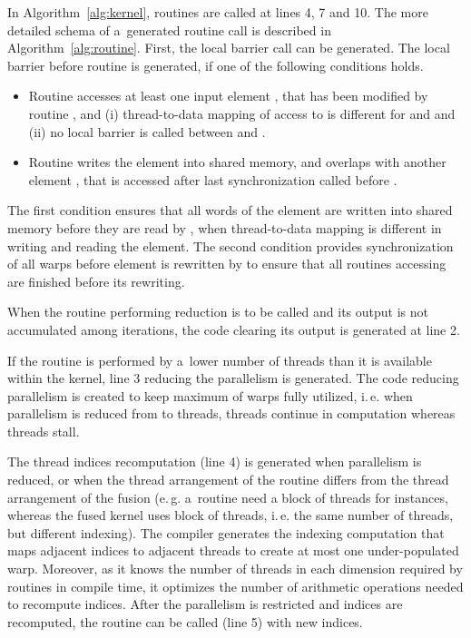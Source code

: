 \documentclass[final]{siamltex}
\def\eg{e.\,g.}
\def\ie{i.\,e.}
\begin{document}
{In Algorithm~\ref{alg:kernel}, routines are called at lines 4, 7 and 10. The more detailed schema of a~generated routine call is described in Algorithm~\ref{alg:routine}. First, the local barrier call can be generated. The local barrier before routine  is generated, if one of the following conditions holds.
\begin{itemize}
\item Routine  accesses at least one input element , that has been modified by routine , and (i) thread-to-data mapping of access to  is different for  and  and (ii) no local barrier is called between  and .
        \item Routine  writes the element  into shared memory, and  overlaps with another element , that is accessed after last synchronization called before .
\end{itemize}

The first condition ensures that all words of the element  are written into shared memory before they are read by , when thread-to-data mapping is different in writing and reading the element. The second condition provides synchronization of all warps before element  is rewritten by  to ensure that all routines accessing  are finished before its rewriting.



When the routine performing reduction is to be called and its output is not accumulated among iterations, the code clearing its output is generated at line 2.

If the routine is performed by a~lower number of threads than it is available within the kernel, line 3 reducing the parallelism is generated. The code reducing parallelism is created to keep maximum of warps fully utilized, \ie{} when parallelism is reduced from  to  threads, threads  continue in computation whereas threads  stall.

The thread indices recomputation (line 4) is generated when parallelism is reduced, or when the thread arrangement of the routine differs from the thread arrangement of the fusion (\eg{} a~routine need a block of  threads for  instances, whereas the fused kernel uses block of  threads, \ie{} the same number of threads, but different indexing). The compiler generates the indexing computation that maps adjacent indices to adjacent threads to create at most one under-populated warp. Moreover, as it knows the number of threads in each dimension required by routines in compile time, it optimizes the number of arithmetic operations needed to recompute indices. After the parallelism is restricted and indices are recomputed, the routine can be called (line 5) with new indices.





























}
\end{document}
